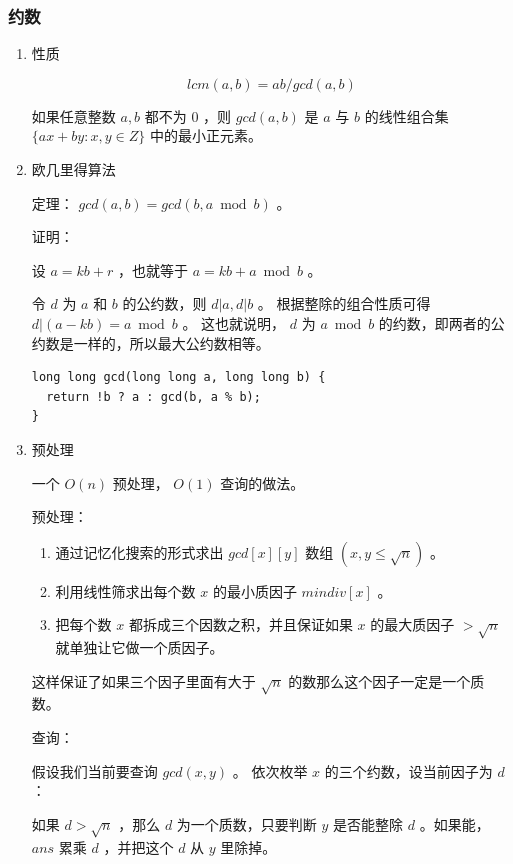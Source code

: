 \documentclass[11pt]{article}
\begin{document}
\subsubsection{约数}
\label{sec-3-1-1}
\begin{enumerate}
\item 性质
\label{sec-3-1-1-1}

$$
lcm(a,b) = ab/gcd(a,b)
$$

如果任意整数 $a,b$ 都不为 $0$  ，则 $gcd(a,b)$ 是 $a$ 与 $b$ 的线性组合集 $\{ax+by:x,y \in Z\}$ 中的最小正元素。

\item 欧几里得算法
\label{sec-3-1-1-2}

定理： $gcd(a, b) = gcd(b, a \bmod b)$ 。

证明：

设 $a = kb + r$  ，也就等于 $a = kb + a \bmod b$  。

令 $d$ 为 $a$ 和 $b$ 的公约数，则 $d|a,d|b$ 。 根据整除的组合性质可得 $d|(a-kb)=a \bmod b$  。
这也就说明， $d$ 为 $a \bmod b$ 的约数，即两者的公约数是一样的，所以最大公约数相等。

\begin{verbatim}
long long gcd(long long a, long long b) {
  return !b ? a : gcd(b, a % b);
}
\end{verbatim}

\item 预处理
\label{sec-3-1-1-3}

一个 $O(n)$ 预处理， $O(1)$ 查询的做法。

预处理：

\begin{enumerate}
\item 通过记忆化搜索的形式求出 $gcd[x][y]$ 数组 $(x,y \leq\sqrt{n})$ 。

\item 利用线性筛求出每个数 $x$ 的最小质因子 $mindiv[x]$ 。

\item 把每个数 $x$ 都拆成三个因数之积，并且保证如果 $x$ 的最大质因子 $> \sqrt{n}$ 就单独让它做一个质因子。
\end{enumerate}

这样保证了如果三个因子里面有大于 $\sqrt{n}$ 的数那么这个因子一定是一个质数。

查询：

假设我们当前要查询 $gcd(x,y)$ 。 依次枚举 $x$ 的三个约数，设当前因子为 $d$  ：

如果 $d>\sqrt{n}$ ，那么 $d$ 为一个质数，只要判断 $y$ 是否能整除 $d$ 。如果能， $ans$ 累乘 $d$ ，并把这个 $d$ 从 $y$ 里除掉。


\end{enumerate}
\end{document}
